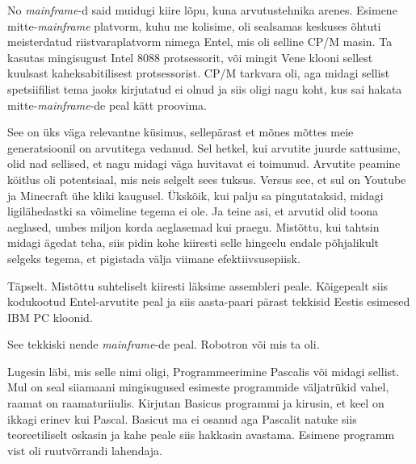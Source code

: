 No \emph{mainframe}-d said muidugi kiire lõpu, kuna arvutustehnika arenes. 
Esimene mitte-\emph{mainframe} platvorm, kuhu me kolisime, oli sealsamas 
keskuses õhtuti meisterdatud riistvaraplatvorm nimega 
Entel, mis oli selline CP/M masin. Ta kasutas mingisugust 
Intel 8088 protsessorit, või mingit Vene klooni sellest kuulsast 
kaheksabitilisest protsessorist. CP/M tarkvara oli, aga midagi sellist 
spetsiifilist tema jaoks kirjutatud ei olnud ja  siis oligi nagu koht, kus sai 
hakata mitte-\emph{mainframe}-de peal kätt proovima. 


See on üks väga relevantne küsimus, sellepärast et mõnes mõttes meie 
generatsioonil on arvutitega vedanud. Sel hetkel, kui arvutite juurde 
sattusime, olid nad sellised, et nagu midagi väga huvitavat ei toimunud. 
Arvutite peamine köitlus oli potentsiaal, mis neis selgelt sees tuksus. Versus 
see, et sul on Youtube ja Minecraft ühe kliki kaugusel. Ükskõik, kui palju sa  
pingutataksid, midagi  ligilähedastki sa võimeline tegema ei ole. Ja teine asi, 
et arvutid olid toona aeglased,  umbes  miljon korda aeglasemad kui praegu. 
Mistõttu, kui tahtsin midagi ägedat teha, siis pidin kohe kiiresti selle 
hingeelu endale põhjalikult selgeks tegema, et pigistada välja viimane 
efektiivsusepiisk.


Täpselt. Mistõttu suhteliselt kiiresti läksime 
assembleri peale. Kõigepealt siis kodukootud 
Entel-arvutite peal ja siis aasta-paari pärast tekkisid Eestis esimesed IBM PC 
kloonid. 


See tekkiski nende \emph{mainframe}-de peal. Robotron või mis ta oli.


Lugesin läbi, mis selle nimi oligi, Programmeerimine 
Pascalis 
või midagi sellist. Mul on seal siiamaani mingisugused esimeste programmide 
väljatrükid  vahel, raamat on raamaturiiulis. Kirjutan 
Basicus programmi ja kirusin, et keel on ikkagi erinev kui 
Pascal. Basicut ma ei osanud aga Pascalit natuke siis teoreetiliselt oskasin ja 
kahe peale siis hakkasin avastama. Esimene programm vist oli ruutvõrrandi 
lahendaja.

